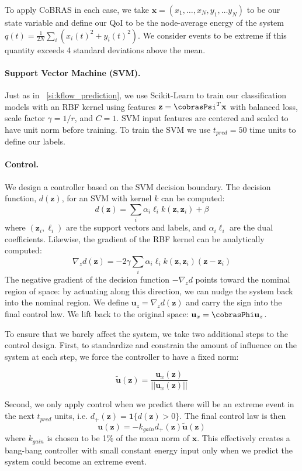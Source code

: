 \documentclass[twocolumn,10pt]{article}
\begin{document}
To apply CoBRAS in each case, we take $\mathbf x = (x_1, \dots, x_N, y_1, \dots y_N)$ to be our state variable and define our QoI to be the node-average energy of the system $q(t) = \frac{1}{2N}\sum_i\left( x_i(t)^2 + y_i(t)^2\right)$. We consider events to be extreme if this quantity exceeds 4 standard deviations above the mean.

\paragraph{Support Vector Machine (SVM).} Just as in ~\ref{si:kflow_prediction}, we use Scikit-Learn to train our classification models with an RBF kernel using features $\mathbf z = \cobrasPsi^T \mathbf x$ with balanced loss, scale factor $\gamma = 1/r$, and $C=1$. SVM input features are centered and scaled to have unit norm before training. To train the SVM we use $t_{pred} = 50$ time units to define our labels.

\paragraph{Control.} We design a controller based on the SVM decision boundary. The decision function, $d(\mathbf z)$, for an SVM with kernel $k$ can be computed: 
$$
    d(\mathbf z) = \sum_i \alpha_i \ell_i k(\mathbf z, \mathbf z_i) + \beta
$$
\noindent where $(\mathbf z_i, \ell_i)$ are the support vectors and labels, and $\alpha_i \ell_i$ are the dual coefficients. Likewise, the gradient of the RBF kernel can be analytically computed: 
$$
\nabla_ z d(\mathbf z) = -2 \gamma \sum_i \alpha_i \ell_i k(\mathbf z, \mathbf z_i) (\mathbf z - \mathbf z_i)
$$
The negative gradient of the decision function $-\nabla_z d$ points toward the nominal region of space: by actuating along this direction, we can nudge the system back into the nominal region. We define $\mathbf u_{z} = \nabla_z d(\mathbf z)$ and carry the sign into the final control law. We lift back to the original space: $\mathbf u_x = \cobrasPhi \mathbf u_z$.

To ensure that we barely affect the system, we take two additional steps to the control design.
First, to standardize and constrain the amount of influence on the system at each step, we force the controller to have a fixed norm:

$$
\tilde{\mathbf u}(\mathbf z) = \frac{\mathbf u_x (\mathbf{z})}{ ||\mathbf u_x(\mathbf{z})||}
$$

\noindent Second, we only apply control when we predict there will be an extreme event in the next $t_{pred}$ units, i.e. $d_{+}(\mathbf z) =\mathbf 1\{{d(\mathbf z) > 0}\}$. The final control law is then 
$$
\mathbf u(\mathbf z) = -k_{gain}d_{+}(\mathbf z) \tilde{\mathbf u}(\mathbf{z}) 
$$
\noindent where $k_{gain}$ is chosen to be 1\% of the mean norm of $\mathbf x$. This effectively creates a bang-bang controller with small constant energy input only when we predict the system could become an extreme event. 
\end{document}
